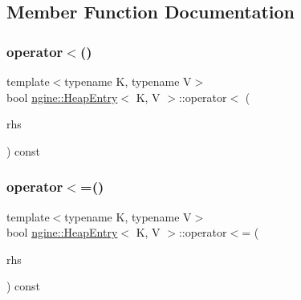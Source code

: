 \subsection{Member Function Documentation}
\mbox{\label{structngine_1_1HeapEntry_aeb5c971824a3b25ad8843ce80f2600eb}} 
\subsubsection{\texorpdfstring{operator$<$()}{operator<()}}
{\footnotesize\ttfamily template$<$typename K, typename V$>$ \\
bool \hyperlink{structngine_1_1HeapEntry}{ngine\+::\+Heap\+Entry}$<$ K, V $>$\+::operator$<$ (\begin{DoxyParamCaption}\item[{const \hyperlink{structngine_1_1HeapEntry}{Heap\+Entry}$<$ K, V $>$ \&}]{rhs }\end{DoxyParamCaption}) const\hspace{0.3cm}{\ttfamily [inline]}}

\mbox{\label{structngine_1_1HeapEntry_a2e385bab83f06e8098b7bbbbf30411b5}} 
\subsubsection{\texorpdfstring{operator$<$=()}{operator<=()}}
{\footnotesize\ttfamily template$<$typename K, typename V$>$ \\
bool \hyperlink{structngine_1_1HeapEntry}{ngine\+::\+Heap\+Entry}$<$ K, V $>$\+::operator$<$= (\begin{DoxyParamCaption}\item[{const \hyperlink{structngine_1_1HeapEntry}{Heap\+Entry}$<$ K, V $>$ \&}]{rhs }\end{DoxyParamCaption}) const\hspace{0.3cm}{\ttfamily [inline]}}

\mbox{\label{structngine_1_1HeapEntry_a7570baae4b55e024f1b111e8bd92be77}} 
